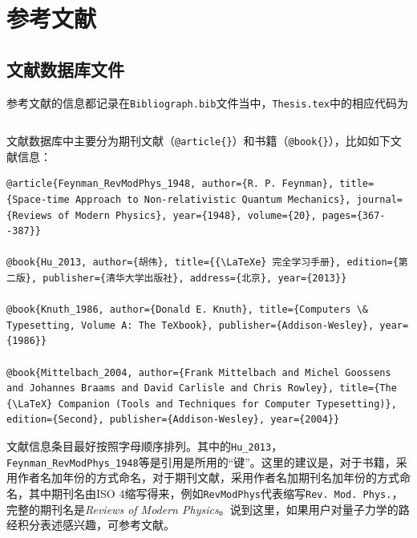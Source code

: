 \section{参考文献}



\subsection{文献数据库文件}
\par 参考文献的信息都记录在\texttt{Bibliograph.bib}文件当中，\texttt{Thesis.tex}中的相应代码为
\begin{lstlisting}[language=TeX]

\end{lstlisting}
文献数据库中主要分为期刊文献（\verb"@article{}"）和书籍（\verb"@book{}"），比如如下文献信息：
\begin{lstlisting}
@article{Feynman_RevModPhys_1948, author={R. P. Feynman}, title={Space-time Approach to Non-relativistic Quantum Mechanics}, journal={Reviews of Modern Physics}, year={1948}, volume={20}, pages={367--387}}

@book{Hu_2013, author={胡伟}, title={{\LaTeXe} 完全学习手册}, edition={第二版}, publisher={清华大学出版社}, address={北京}, year={2013}}

@book{Knuth_1986, author={Donald E. Knuth}, title={Computers \& Typesetting, Volume A: The TeXbook}, publisher={Addison-Wesley}, year={1986}}

@book{Mittelbach_2004, author={Frank Mittelbach and Michel Goossens and Johannes Braams and David Carlisle and Chris Rowley}, title={The {\LaTeX} Companion (Tools and Techniques for Computer Typesetting)}, edition={Second}, publisher={Addison-Wesley}, year={2004}}
\end{lstlisting}
文献信息条目最好按照字母顺序排列。其中的\texttt{Hu\_2013}，\texttt{Feynman\_RevModPhys\_1948}等是引用是所用的“键”。这里的建议是，对于书籍，采用作者名加年份的方式命名，对于期刊文献，采用作者名加期刊名加年份的方式命名，其中期刊名由ISO 4缩写得来，例如\texttt{RevModPhys}代表缩写\texttt{Rev. Mod. Phys.}，完整的期刊名是\textit{Reviews of Modern Physics}。说到这里，如果用户对量子力学的路经积分表述感兴趣，可参考文献\cite{Feynman_RevModPhys_1948}。



